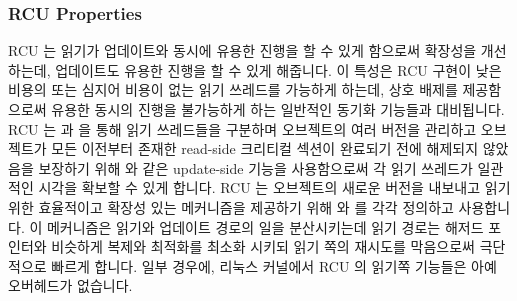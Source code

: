 \subsubsection{RCU Properties}
\label{sec:defer:RCU Properties}

RCU 는 읽기가 업데이트와 동시에 유용한 진행을 할 수 있게 함으로써 확장성을
개선하는데, 업데이트도 유용한 진행을 할 수 있게 해줍니다.
이 특성은 RCU 구현이 낮은 비용의 또는 심지어 비용이 없는 읽기 쓰레드를 가능하게
하는데, 상호 배제를 제공함으로써 유용한 동시의 진행을 불가능하게 하는 일반적인
동기화 기능들과 대비됩니다.
RCU 는  과  을 통해 읽기 쓰레드들을
구분하며 오브젝트의 여러 버전을 관리하고 오브젝트가 모든 이전부터 존재한
read-side 크리티컬 섹션이 완료되기 전에 해제되지 않았음을 보장하기 위해
 와 같은 update-side 기능을 사용함으로써 각 읽기 쓰레드가
일관적인 시각을 확보할 수 있게 합니다.
RCU 는 오브젝트의 새로운 버전을 내보내고 읽기 위한 효율적이고 확장성 있는
메커니즘을 제공하기 위해  와  를
각각 정의하고 사용합니다.
이 메커니즘은 읽기와 업데이트 경로의 일을 분산시키는데 읽기 경로는 해저드
포인터와 비슷하게 복제와 최적화를 최소화 시키되 읽기 쪽의 재시도를 막음으로써
극단적으로 빠르게 합니다.
일부 경우에,  리눅스 커널에서 RCU 의 읽기쪽 기능들은 아예
오버헤드가 없습니다.

